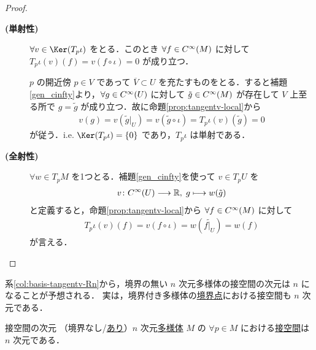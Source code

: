 \documentclass[geometry_main]{subfiles}
\begin{document}
\begin{proof}
	\begin{description}
		\item[\textbf{(単射性)}] $\forall v \in \Ker (T_p \iota)$ をとる．このとき $\forall f \in C^\infty(M)$ に対して $T_p \iota (v)(f) = v (f \circ \iota) = 0$ が成り立つ．
		
		$p$ の開近傍 $p \in V$ であって $\overline{V} \subset U$ を充たすものをとる．すると補題\ref{gen_cinfty}より，$\forall g \in C^\infty(U)$ に対して $\tilde{g} \in C^\infty(M)$ が存在して
		$V$ 上至る所で $g = \tilde{g}$ が成り立つ．故に命題\ref{prop:tangentv-local}から
		\begin{align}
			v(g) = v(\tilde{g}|_U)  = v(\tilde{g} \circ \iota) = T_p \iota (v) (\tilde{g}) = 0
		\end{align}
		が従う．i.e. $\Ker (T_p\iota) = \{0\}$ であり，$T_p \iota$ は単射である．
		\item[\textbf{(全射性)}] $\forall w \in T_p M$ を1つとる．補題\ref{gen_cinfty}を使って $v \in T_p U$ を
		\begin{align}
			v \colon C^\infty(U) \longrightarrow \mathbb{R},\; g \longmapsto w(\tilde{g})
		\end{align}
		と定義すると，命題\ref{prop:tangentv-local}から $\forall f \in C^\infty(M)$ に対して
		\begin{align}
			T_p \iota (v)(f) = v(f \circ \iota) = w (\widetilde{f|_U}) = w(f)
		\end{align}
		が言える．
	\end{description}
\end{proof}

系\ref{col:basis-tangentv-Rn}から，境界の無い $n$ 次元\cinfty 多様体の接空間の次元は $n$ になることが予想される．
実は，境界付き\cinfty 多様体の\hyperref[def:int-manifold-with-boundary]{境界点}における接空間も $n$ 次元である．

\begin{myprop}[label=prop:dim-tangentv]{接空間の次元}
	（境界なし/\hyperref[def:mani-with-boundary]{あり}）$n$ 次元\hyperref[diffmani]{\cinfty 多様体} $M$ の $\forall p \in M$ における\hyperref[def.tangentv]{接空間}は $n$ 次元である．
\end{myprop}
\end{document}
